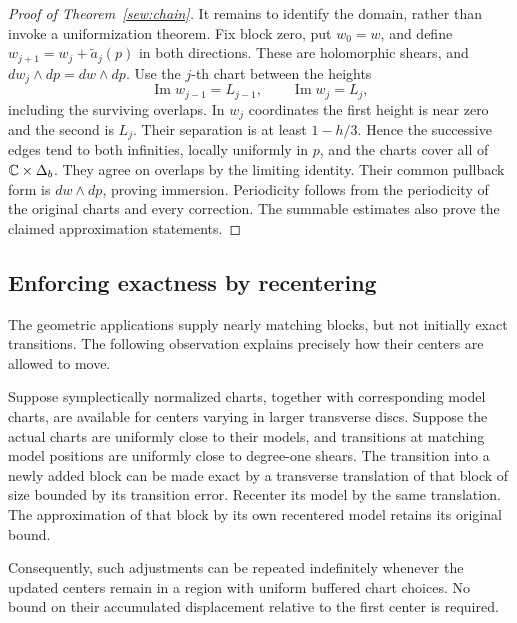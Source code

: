 \begin{proof}[Proof of Theorem~\ref{sew:chain}]
It remains to identify the domain, rather than invoke a
uniformization theorem.  Fix block zero, put $w_0=w$, and define
$w_{j+1}=w_j+\widetilde a_j(p)$ in both directions.  These are
holomorphic shears, and $dw_j\wedge dp=dw\wedge dp$.  Use the
$j$-th chart between the heights
\[
       \operatorname{Im}w_{j-1}=L_{j-1},\qquad
       \operatorname{Im}w_j=L_j,
\]
including the surviving overlaps.  In $w_j$ coordinates the first
height is near zero and the second is $L_j$.  Their separation is
at least $1-h/3$.  Hence the successive edges tend to both
infinities, locally uniformly in $p$, and the charts cover all of
$\mathbb C\times\Delta_b$.  They agree on overlaps by the limiting
identity.  Their common pullback form is $dw\wedge dp$, proving
immersion.  Periodicity follows from the periodicity of the original
charts and every correction.  The summable estimates also prove
the claimed approximation statements.
\end{proof}

\subsection{Enforcing exactness by recentering}

The geometric applications supply nearly matching blocks, but not
initially exact transitions.  The following observation explains
precisely how their centers are allowed to move.

\begin{lemma}\label{sew:centers}
Suppose symplectically normalized charts, together with corresponding
model charts, are available for centers varying in larger transverse
discs.  Suppose the actual charts are uniformly close to their
models, and transitions at matching model positions are uniformly
close to degree-one shears.  The transition into a newly added block
can be made exact by a transverse translation of that block of size
bounded by its transition error.  Recenter its model by the same
translation.  The approximation of that block by its own recentered
model retains its original bound.

Consequently, such adjustments can be repeated indefinitely whenever
the updated centers remain in a region with uniform buffered chart
choices.  No bound on their accumulated displacement relative to
the first center is required.
\end{lemma}

